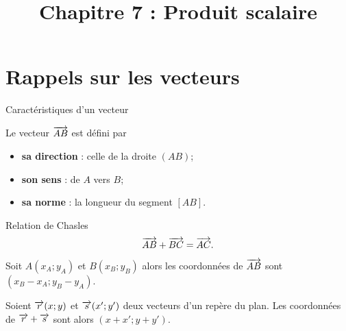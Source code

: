 \documentclass[11pt]{article}
\title{Chapitre 7 : Produit scalaire}
\date{}
\author{}
\begin{document}
\maketitle\thispagestyle{fancy}

\section{Rappels sur les vecteurs}
\begin{defi}{Caractéristiques d'un vecteur}
  \begin{minipage}{.5\textwidth}
  Le vecteur $\overrightarrow{AB}$ est défini par
  \begin{itemize}
    \item \textbf{sa direction} : celle de la droite $\left( AB \right)$;
    \item \textbf{son sens} : de $A$ vers $B$;
    \item \textbf{sa norme} : la longueur du segment $\left[ AB \right]$.
  \end{itemize}
  \end{minipage}
  \begin{minipage}{.5\textwidth}
  \begin{center}
  \end{center}
  \end{minipage}
\end{defi}
\noindent\begin{minipage}[b]{.5\textwidth}
\begin{propnom}{Relation de Chasles}
  \[
    \overrightarrow{AB}+\overrightarrow{BC} = \overrightarrow{AC}.
  \]
  \begin{center}
  \end{center}
\end{propnom}
\end{minipage}
\begin{minipage}[b]{.5\textwidth}
\begin{prop}
  Soit $A\left( x_A; y_A \right)$ et $B\left( x_B; y_B \right)$ alors les
  coordonnées de $\overrightarrow{AB}$ sont $(x_B-x_A; y_B-y_A)$.
\end{prop}

\begin{prop}
  Soient $\overrightarrow{r}(x;y)$ et $\overrightarrow{s}(x';y')$ deux vecteurs d'un repère du plan.
  Les coordonnées de $\overrightarrow{r} +\overrightarrow{s}$ sont alors $(x+x';y+y')$.
\end{prop}
\end{minipage}
\end{document}
